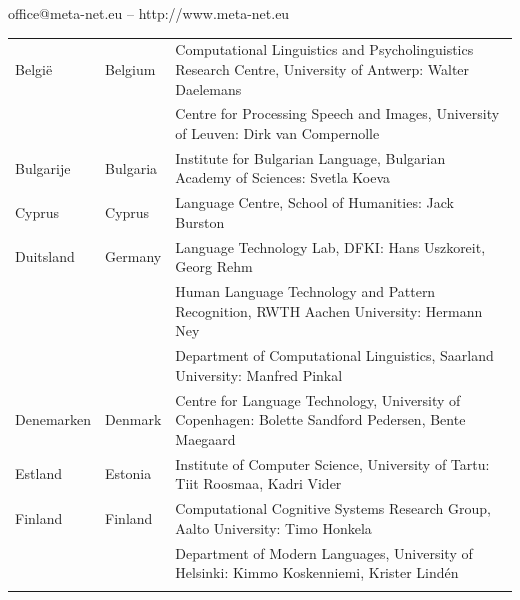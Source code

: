 \documentclass[]{../../metanetpaper}
\begin{document}
\vfill
\centerline{office@meta-net.eu -- http://www.meta-net.eu}

\cleardoublepage

\appendix
{}

%


\cleardoublepage

\label{metanetmembers}

\small

\begin{longtable}{@{}llp{113mm}@{}}
  Belgi{\"e} & \textcolor{grey1}{Belgium} & Computational Linguistics and Psycholinguistics Research Centre, University of Antwerp: Walter Daelemans\\ \addlinespace
  & & Centre for Processing Speech and Images, University of Leuven: Dirk van Compernolle \\ \addlinespace
  Bulgarije & \textcolor{grey1}{Bulgaria} & Institute for Bulgarian Language, Bulgarian Academy of Sciences: Svetla Koeva \\ \addlinespace
   Cyprus & \textcolor{grey1}{Cyprus} & Language Centre, School of Humanities: Jack Burston \\ \addlinespace
  Duitsland & \textcolor{grey1}{Germany} & Language Technology Lab, DFKI: Hans Uszkoreit, Georg Rehm\\ \addlinespace
  & & Human Language Technology and Pattern Recognition, RWTH Aachen University: Hermann Ney \\ \addlinespace
  & & Department of Computational Linguistics, Saarland University: Manfred Pinkal\\\addlinespace 
  Denemarken &  \textcolor{grey1}{Denmark} & Centre for Language Technology, University of Copenhagen: \newline Bolette Sandford Pedersen, Bente Maegaard\\ \addlinespace
  Estland & \textcolor{grey1}{Estonia} & Institute of Computer Science, University of Tartu: Tiit Roosmaa, Kadri Vider\\ \addlinespace
  Finland & \textcolor{grey1}{Finland} & Computational Cognitive Systems Research Group, Aalto University: Timo Honkela\\ \addlinespace
  & & Department of Modern Languages, University of Helsinki: Kimmo Koskenniemi, Krister Lindén \\ \addlinespace

\end{longtable}
\end{document}
